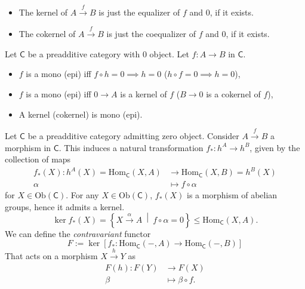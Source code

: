\begin{rem}\leavevmode\vspace{-.2\baselineskip}
	\begin{itemize}
		\item The kernel of $A \xrightarrow{f} B$ is just the equalizer of $f$ and $0$, if it exists.
		\item The cokernel of $A \xrightarrow{f} B$ is just the coequalizer of $f$ and $0$, if it exists.
	\end{itemize}
\end{rem}

\begin{lem}
	Let $\mathsf{C}$ be a preadditive category with $0$ object.
	Let $f: A \to B$ in $\mathsf{C}$.
	\begin{itemize}
		\item $f$ is a mono (epi) iff $f \circ h = 0 \implies h = 0$ ($h \circ f = 0 \implies h = 0$),
		\item $f$ is a mono (epi) iff $0 \to A$ is a kernel of $f$ ($B \to 0$ is a cokernel of $f$),
		\item A kernel (cokernel) is mono (epi).
	\end{itemize}
\end{lem} 

\begin{defn}
	Let $\mathsf{C}$ be a preadditive category admitting zero object.
	Consider $A \xrightarrow{f} B$ a morphism in $\mathsf{C}$.
	This induces a natural transformation 
	$f_*\colon h^A \to h^B$, given by the collection of maps
	\begin{align}
		f_*(X): h^A(X) = \mathrm{Hom}_{\mathsf{C}} \left( X, A \right) &\to \mathrm{Hom}_{\mathsf{C}} \left( X, B \right) = h^B(X) \\
		\alpha &\mapsto f \circ \alpha
	\end{align} 
	for $X \in \mathrm{Ob} \left(\mathsf{C}\right)$.
	For any $X \in \mathrm{Ob} \left(\mathsf{C}\right)$,
	$f_*(X)$ is a morphism of abelian groups, hence it admits a kernel.
	\begin{equation}
		\ker f_*(X) = \left\{ X \xrightarrow{\alpha} A  \ \middle|\ f \circ \alpha = 0\right\} \leq \mathrm{Hom}_{\mathsf{C}} \left( X, A \right)
	.\end{equation} 
	We can define the {\em contravariant} functor
	\begin{equation}
	F := \ker \left[ f_*: \mathrm{Hom}_{\mathsf{C}} \left( -, A \right) \to \mathrm{Hom}_{\mathsf{C}} \left( -, B \right) \right]
	\end{equation} 
	That acts on a morphism $X \xrightarrow{h} Y$ as
	 \begin{align}
		 F(h): F(Y) &\to F(X) \\
		\beta &\mapsto \beta \circ f
	.\end{align} 
\end{defn}

